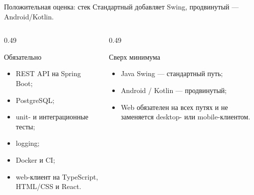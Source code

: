 \begin{frame}{Положительная оценка: стек}
   Стандартный добавляет Swing,
  продвинутый --- Android/Kotlin.

  \medskip
  \small
  \begin{columns}[T]
    \begin{column}{0.49\textwidth}
      \begin{block}{Обязательно}
        \begin{itemize}\setlength\itemsep{0.18em}
          \item REST API на Spring Boot;
          \item PostgreSQL;
          \item unit- и интеграционные тесты;
          \item logging;
          \item Docker и CI;
          \item web-клиент на TypeScript, HTML/CSS и React.
        \end{itemize}
      \end{block}
    \end{column}
    \begin{column}{0.49\textwidth}
      \begin{block}{Сверх минимума}
        \begin{itemize}\setlength\itemsep{0.18em}
          \item Java Swing --- стандартный путь;
          \item Android / Kotlin --- продвинутый;
          \item Web обязателен на всех путях и не заменяется
                desktop- или mobile-клиентом.
        \end{itemize}
      \end{block}
    \end{column}
  \end{columns}
\end{frame}

